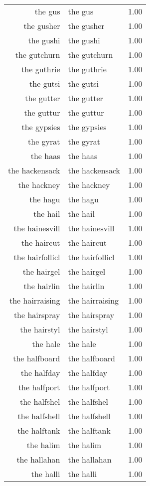 \begin{table}[ht]
\begin{tabular}{rlr}
  the gus & the gus & 1.00 \\ 
  the gusher & the gusher & 1.00 \\ 
  the gushi & the gushi & 1.00 \\ 
  the gutchurn & the gutchurn & 1.00 \\ 
  the guthrie & the guthrie & 1.00 \\ 
  the gutsi & the gutsi & 1.00 \\ 
  the gutter & the gutter & 1.00 \\ 
  the guttur & the guttur & 1.00 \\ 
  the gypsies & the gypsies & 1.00 \\ 
  the gyrat & the gyrat & 1.00 \\ 
  the haas & the haas & 1.00 \\ 
  the hackensack & the hackensack & 1.00 \\ 
  the hackney & the hackney & 1.00 \\ 
  the hagu & the hagu & 1.00 \\ 
  the hail & the hail & 1.00 \\ 
  the hainesvill & the hainesvill & 1.00 \\ 
  the haircut & the haircut & 1.00 \\ 
  the hairfollicl & the hairfollicl & 1.00 \\ 
  the hairgel & the hairgel & 1.00 \\ 
  the hairlin & the hairlin & 1.00 \\ 
  the hairraising & the hairraising & 1.00 \\ 
  the hairspray & the hairspray & 1.00 \\ 
  the hairstyl & the hairstyl & 1.00 \\ 
  the hale & the hale & 1.00 \\ 
  the halfboard & the halfboard & 1.00 \\ 
  the halfday & the halfday & 1.00 \\ 
  the halfport & the halfport & 1.00 \\ 
  the halfshel & the halfshel & 1.00 \\ 
  the halfshell & the halfshell & 1.00 \\ 
  the halftank & the halftank & 1.00 \\ 
  the halim & the halim & 1.00 \\ 
  the hallahan & the hallahan & 1.00 \\ 
  the halli & the halli & 1.00 \\ 

\end{tabular}
\end{table}
